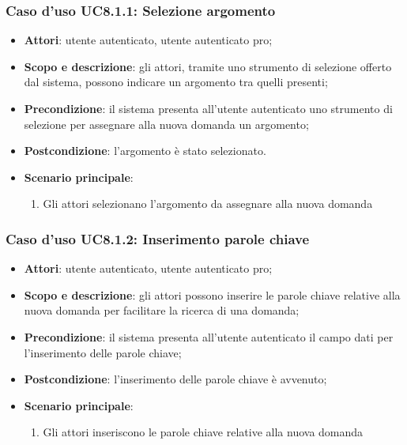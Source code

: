 	\subsubsection{Caso d'uso UC8.1.1: Selezione argomento}
	\begin{itemize}
		\item
			\textbf{Attori}: utente autenticato, utente autenticato pro;
		\item
			\textbf{Scopo e descrizione}: gli attori, tramite uno strumento di selezione offerto dal sistema, possono indicare un argomento tra quelli presenti;
		\item		
			\textbf{Precondizione}: il sistema presenta all'utente autenticato uno strumento di selezione per assegnare alla nuova domanda un argomento;
		\item
			\textbf{Postcondizione}: l'argomento è stato selezionato.
		\item
			\textbf{Scenario principale}:
				\begin{enumerate}
					\item 	
						Gli attori selezionano l'argomento da assegnare alla nuova domanda	
				\end{enumerate}
	\end{itemize}	
	\subsubsection{Caso d'uso UC8.1.2: Inserimento parole chiave}
	\begin{itemize}
		\item
			\textbf{Attori}: utente autenticato, utente autenticato pro;
		\item
			\textbf{Scopo e descrizione}: gli attori possono inserire le parole chiave relative alla nuova domanda per facilitare la ricerca di una domanda;
		\item		
			\textbf{Precondizione}: il sistema presenta all'utente autenticato il campo dati per l'inserimento delle parole chiave;
		\item
			\textbf{Postcondizione}: l'inserimento delle parole chiave è avvenuto;
		\item
			\textbf{Scenario principale}:
				\begin{enumerate}
					\item 	
						Gli attori inseriscono le parole chiave relative alla nuova domanda	
				\end{enumerate}
	\end{itemize}


